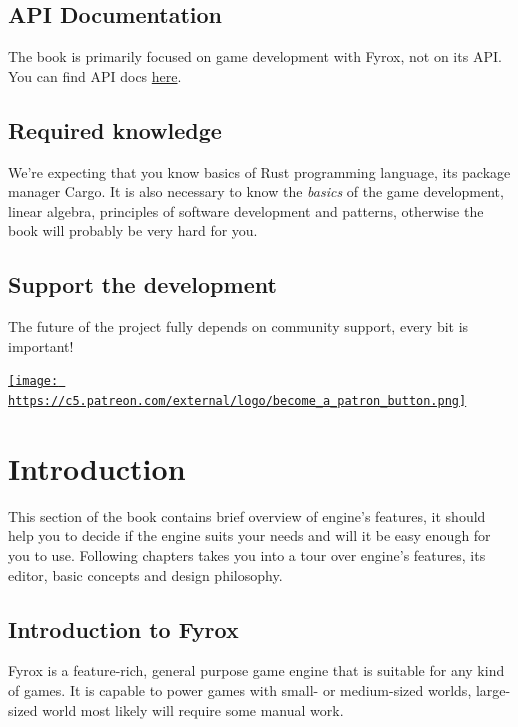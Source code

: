 \documentclass[
]{book}
\theoremstyle{definition}
\theoremstyle{definition}
\theoremstyle{definition}
\theoremstyle{definition}
\theoremstyle{remark}
\begin{document}
\section{API Documentation}\label{api-documentation}

The book is primarily focused on game development with Fyrox, not on its API. You can find API docs \href{https://docs.rs/fyrox/latest/fyrox/}{here}.

\section{Required knowledge}\label{required-knowledge}

We're expecting that you know basics of Rust programming language, its package manager Cargo. It is also necessary to know the \emph{basics} of the game development, linear algebra, principles of software development and patterns, otherwise the book will probably be very hard for you.

\section{Support the development}\label{support-the-development}

The future of the project fully depends on community support, every bit is important!

\href{https://www.patreon.com/mrdimas}{\texttt{[image: https://c5.patreon.com/external/logo/become\_a\_patron\_button.png]}}

\chapter{Introduction}\label{introduction}

This section of the book contains brief overview of engine's features, it should help you to decide if the engine suits
your needs and will it be easy enough for you to use. Following chapters takes you into a tour over engine's features,
its editor, basic concepts and design philosophy.

\section{Introduction to Fyrox}\label{introduction-to-fyrox}

Fyrox is a feature-rich, general purpose game engine that is suitable for any kind of games. It is capable to power games with small- or medium-sized worlds, large-sized world most likely will require some manual work.
\end{document}
